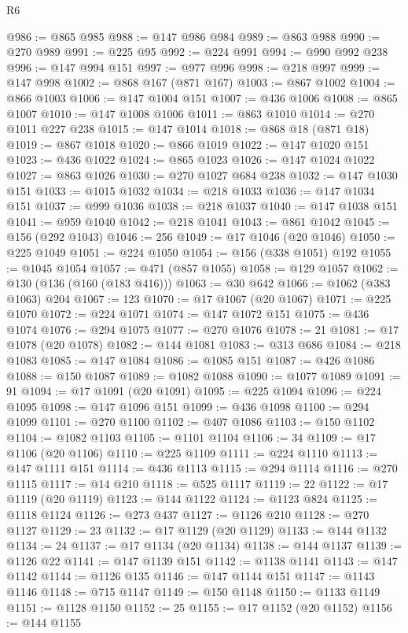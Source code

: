 \begin{lexlean}{R6}
\begin{coremodule}
@986 := @865 @985
@988 := @147 @986 @984
@989 := @863 @988
@990 := @270 @989
@991 := @225 @95
@992 := @224 @991
@994 := @990 @992 @238
@996 := @147 @994 @151
@997 := @977 @996
@998 := @218 @997
@999 := @147 @998
@1002 := @868 @167 (@871 @167)
@1003 := @867 @1002
@1004 := @866 @1003
@1006 := @147 @1004 @151
@1007 := @436 @1006
@1008 := @865 @1007
@1010 := @147 @1008 @1006
@1011 := @863 @1010
@1014 := @270 @1011 @227 @238
@1015 := @147 @1014
@1018 := @868 @18 (@871 @18)
@1019 := @867 @1018
@1020 := @866 @1019
@1022 := @147 @1020 @151
@1023 := @436 @1022
@1024 := @865 @1023
@1026 := @147 @1024 @1022
@1027 := @863 @1026
@1030 := @270 @1027 @684 @238
@1032 := @147 @1030 @151
@1033 := @1015 @1032
@1034 := @218 @1033
@1036 := @147 @1034 @151
@1037 := @999 @1036
@1038 := @218 @1037
@1040 := @147 @1038 @151
@1041 := @959 @1040
@1042 := @218 @1041
@1043 := @861 @1042
@1045 := @156 (@292 @1043)
@1046 := 256
@1049 := @17 @1046 (@20 @1046)
@1050 := @225 @1049
@1051 := @224 @1050
@1054 := @156 (@338 @1051) @192
@1055 := @1045 @1054
@1057 := @471 (@857 @1055)
@1058 := @129 @1057
@1062 := @130 (@136 (@160 (@183 @416)))
@1063 := @30 @642
@1066 := @1062 (@383 @1063) @204
@1067 := 123
@1070 := @17 @1067 (@20 @1067)
@1071 := @225 @1070
@1072 := @224 @1071
@1074 := @147 @1072 @151
@1075 := @436 @1074
@1076 := @294 @1075
@1077 := @270 @1076
@1078 := 21
@1081 := @17 @1078 (@20 @1078)
@1082 := @144 @1081
@1083 := @313 @686
@1084 := @218 @1083
@1085 := @147 @1084
@1086 := @1085 @151
@1087 := @426 @1086
@1088 := @150 @1087
@1089 := @1082 @1088
@1090 := @1077 @1089
@1091 := 91
@1094 := @17 @1091 (@20 @1091)
@1095 := @225 @1094
@1096 := @224 @1095
@1098 := @147 @1096 @151
@1099 := @436 @1098
@1100 := @294 @1099
@1101 := @270 @1100
@1102 := @407 @1086
@1103 := @150 @1102
@1104 := @1082 @1103
@1105 := @1101 @1104
@1106 := 34
@1109 := @17 @1106 (@20 @1106)
@1110 := @225 @1109
@1111 := @224 @1110
@1113 := @147 @1111 @151
@1114 := @436 @1113
@1115 := @294 @1114
@1116 := @270 @1115
@1117 := @14 @210
@1118 := @525 @1117
@1119 := 22
@1122 := @17 @1119 (@20 @1119)
@1123 := @144 @1122
@1124 := @1123 @824
@1125 := @1118 @1124
@1126 := @273 @437
@1127 := @1126 @210
@1128 := @270 @1127
@1129 := 23
@1132 := @17 @1129 (@20 @1129)
@1133 := @144 @1132
@1134 := 24
@1137 := @17 @1134 (@20 @1134)
@1138 := @144 @1137
@1139 := @1126 @22
@1141 := @147 @1139 @151
@1142 := @1138 @1141
@1143 := @147 @1142
@1144 := @1126 @135
@1146 := @147 @1144 @151
@1147 := @1143 @1146
@1148 := @715 @1147
@1149 := @150 @1148
@1150 := @1133 @1149
@1151 := @1128 @1150
@1152 := 25
@1155 := @17 @1152 (@20 @1152)
@1156 := @144 @1155

\end{coremodule}
\end{lexlean}
